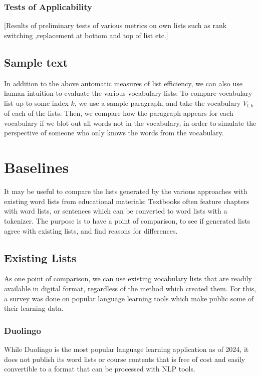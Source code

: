 \subsubsection{Tests of Applicability}
[Results of preliminary tests of various metrics on own lists such as rank switching ,replacement at bottom and top of list etc.]

\subsection{Sample text}
In addition to the above automatic measures of list efficiency, we can also use human intuition to evaluate the various vocabulary lists:
To compare vocabulary list up to some index $k$, we use a sample paragraph, and take the vocabulary $V_{l, k}$ of each of the lists.
Then, we compare how the paragraph appears for each vocabulary if we blot out all words not in the vocabulary, in order to simulate the perspective of someone who only knows the words from the vocabulary.







\section{Baselines}
It may be useful to compare the lists generated by the various approaches with existing word lists from educational materials:
Textbooks often feature chapters with word lists, or sentences which can be converted to word lists with a tokenizer.
The purpose is to have a point of comparison, to see if generated lists agree with existing lists, and find reasons for differences.

\subsection{Existing Lists}
As one point of comparison, we can use existing vocabulary lists that are readily available in digital format, regardless of the method which created them.
For this, a survey was done on popular language learning tools which make public some of their learning data.




\subsubsection{Duolingo}
While Duolingo is the most popular language learning application as of 2024, it does not publish its word lists or course contents that is free of cost and easily convertible to a format that can be processed with NLP tools.

